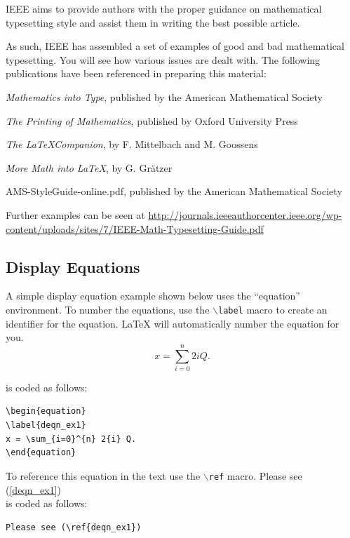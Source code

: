 \documentclass[lettersize,journal]{IEEEtran}
\begin{document}
IEEE aims to provide authors with the proper guidance on mathematical typesetting style and assist them in writing the best possible article.

As such, IEEE has assembled a set of examples of good and bad mathematical typesetting. You will see how various issues are dealt with. The following publications have been referenced in preparing this material:

\begin{list}{}{}
\item{\emph{Mathematics into Type}, published by the American Mathematical Society}
\item{\emph{The Printing of Mathematics}, published by Oxford University Press}
\item{\emph{The \LaTeX Companion}, by F. Mittelbach and M. Goossens}
\item{\emph{More Math into LaTeX}, by G. Gr\"atzer}
\item{AMS-StyleGuide-online.pdf, published by the American Mathematical Society}
\end{list}

Further examples can be seen at \url{http://journals.ieeeauthorcenter.ieee.org/wp-content/uploads/sites/7/IEEE-Math-Typesetting-Guide.pdf}

\subsection{Display Equations}
\noindent A simple display equation example shown below uses the ``equation'' environment. To number the equations, use the $\backslash${\tt{label}} macro to create an identifier for the equation. LaTeX will automatically number the equation for you.
\begin{equation}
\label{deqn_ex1}
x = \sum_{i=0}^{n} 2{i} Q.
\end{equation}

\noindent is coded as follows:
\begin{verbatim}
\begin{equation}
\label{deqn_ex1}
x = \sum_{i=0}^{n} 2{i} Q.
\end{equation}
\end{verbatim}

To reference this equation in the text use the $\backslash${\tt{ref}} macro. 
Please see (\ref{deqn_ex1})\\
\noindent is coded as follows:
\begin{verbatim}
Please see (\ref{deqn_ex1})\end{verbatim}
\end{document}
